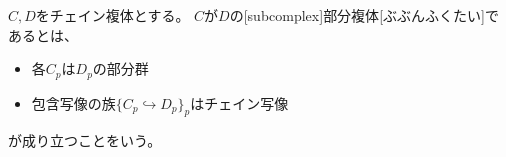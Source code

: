 \documentclass[report]{jlreq}
\begin{document}
\begin{definition}[部分複体]
    $C, D$をチェイン複体とする。
    $C$が$D$の[subcomplex]{部分複体}[ぶぶんふくたい]であるとは、
    \begin{itemize}
        \item 各$C_p$は$D_p$の部分群
        \item 包含写像の族$\{ C_p \hookrightarrow D_p \}_p$はチェイン写像
    \end{itemize}
    が成り立つことをいう。
\end{definition}

\begin{definition}[商複体]
\end{definition}

\begin{definition}[和複体]
\end{definition}
\end{document}
